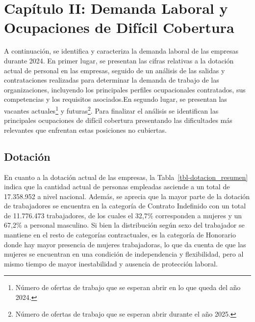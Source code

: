 \documentclass[
  11pt,
]{article}
\begin{document}
\FloatBarrier

\newpage

\section{Capítulo II: Demanda Laboral y Ocupaciones de Difícil
Cobertura}\label{capuxedtulo-ii-demanda-laboral-y-ocupaciones-de-difuxedcil-cobertura}

A continuación, se identifica y caracteriza la demanda laboral de las
empresas durante 2024. En primer lugar, se presentan las cifras
relativas a la dotación actual de personal en las empresas, seguido de
un análisis de las salidas y contrataciones realizadas para determinar
la demanda de trabajo de las organizaciones, incluyendo los principales
perfiles ocupacionales contratados, sus competencias y los requisitos
asociados.En segundo lugar, se presentan las vacantes
actuales\footnote{Número de ofertas de trabajo que se esperan abrir en
  lo que queda del año 2024.} y futuras\footnote{Número de ofertas de
  trabajo que se esperan abrir durante el año 2025.}. Para finalizar el
análisis se identifican las principales ocupaciones de difícil cobertura
presentando las dificultades más relevantes que enfrentan estas
posiciones no cubiertas.

\subsection{Dotación}\label{dotaciuxf3n}

En cuanto a la dotación actual de las empresas, la
Tabla~\ref{tbl-dotacion_resumen} indica que la cantidad actual de
personas empleadas asciende a un total de 17.358.952 a nivel nacional.
Además, se aprecia que la mayor parte de la dotación de trabajadores se
encuentra en la categoría de Contrato Indefinido con un total de
11.776.473 trabajadores, de los cuales el 32,7\% corresponden a mujeres
y un 67,2\% a personal masculino. Si bien la distribución según sexo del
trabajador se mantiene en el resto de categorías contractuales, es la
categoría de Honorario donde hay mayor presencia de mujeres
trabajadoras, lo que da cuenta de que las mujeres se encuentran en una
condición de independencia y flexibilidad, pero al mismo tiempo de mayor
inestabilidad y ausencia de protección laboral.

\FloatBarrier
\end{document}
